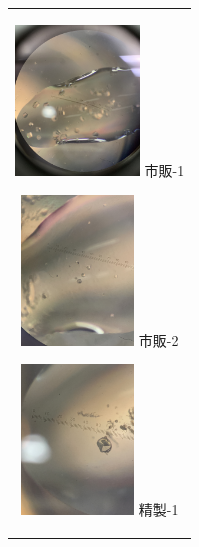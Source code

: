 \documentclass[a4paper,papersize,dvipdfmx]{jsarticle}
\begin{document}
\begin{figure}[H]
\begin{center}
\begin{tabular}{c}

\begin{minipage}{0.22\hsize}
\begin{center}
\includegraphics[clip, height=4cm]{imgs/s-1.jpg}
\hspace{1.6cm} 市販-1
\end{center}
\end{minipage}

\begin{minipage}{0.05\hsize}
\hspace{2mm}
\end{minipage}

\begin{minipage}{0.22\hsize}
\begin{center}
\includegraphics[clip, height=4cm]{imgs/s-2.jpg}
\hspace{1.6cm} 市販-2
\end{center}
\end{minipage}

\begin{minipage}{0.05\hsize}
\hspace{2mm}
\end{minipage}

\begin{minipage}{0.22\hsize}
\begin{center}
\includegraphics[clip, height=4cm]{imgs/se-1.jpg}
\hspace{1.6cm} 精製-1
\end{center}
\end{minipage}

\end{tabular}
\end{center}
\end{figure}
\end{document}

